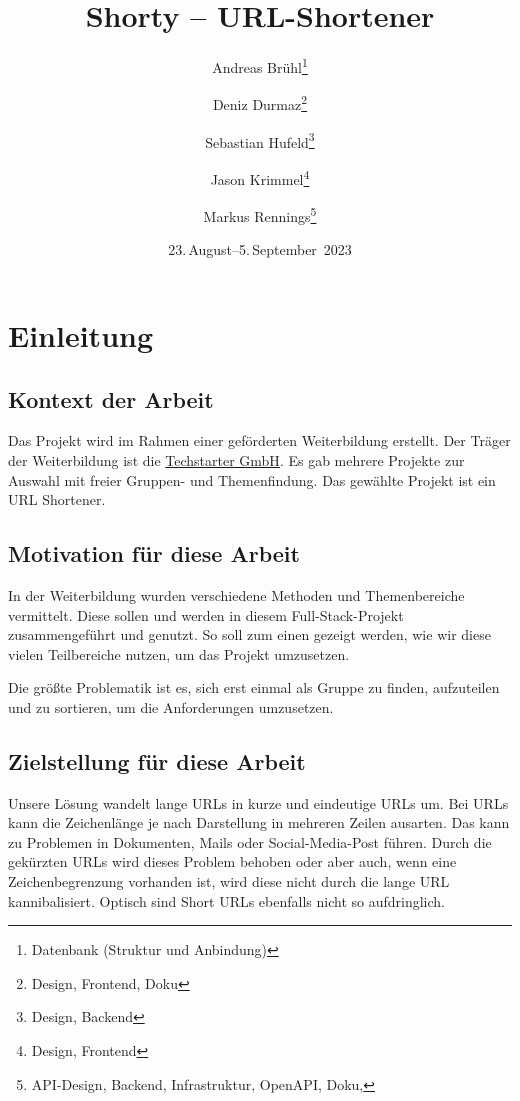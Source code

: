 \documentclass[a4paper,11pt,DIV=12,overfullrule=on]{scrreprt}
\title{Shorty – URL-Shortener}
\subtitle{}
\author{Andreas Brühl\thanks{Datenbank (Struktur und Anbindung)} \and Deniz Durmaz\thanks{Design, Frontend, Doku} \and Sebastian Hufeld\thanks{Design, Backend} \and Jason Krimmel\thanks{Design, Frontend} \and Markus Rennings\thanks{API-Design, Backend, Infrastruktur, OpenAPI, Doku, \XeLaTeX}}
\date{23.\,August–5.\,September~2023}
\begin{document}
\raggedbottom%
\maketitle

\tableofcontents

\chapter{Einleitung}
\section{Kontext der Arbeit}
Das Projekt wird im Rahmen einer geförderten Weiterbildung erstellt. Der Träger der Weiterbildung ist die \href{https://techstarter.de/}{Techstarter GmbH}. Es gab mehrere Projekte zur Auswahl mit freier Gruppen- und Themenfindung. Das gewählte Projekt ist ein URL Shortener.

\section{Motivation für diese Arbeit}
In der Weiterbildung wurden verschiedene Methoden und Themenbereiche vermittelt. Diese sollen und werden in diesem Full-Stack-Projekt zusammengeführt und genutzt. So soll zum einen gezeigt werden, wie wir diese vielen Teilbereiche nutzen, um das Projekt umzusetzen.

Die größte Problematik ist es, sich erst einmal als Gruppe zu finden, aufzuteilen und zu sortieren, um die Anforderungen umzusetzen.

\section{Zielstellung für diese Arbeit}
Unsere Lösung wandelt lange URLs in kurze und eindeutige URLs um. Bei URLs kann die Zeichenlänge je nach Darstellung in mehreren Zeilen ausarten. Das kann zu Problemen in Dokumenten, Mails oder Social-Media-Post führen. Durch die gekürzten URLs wird dieses Problem behoben oder aber auch, wenn eine Zeichenbegrenzung vorhanden ist, wird diese nicht durch die lange URL kannibalisiert. Optisch sind Short URLs ebenfalls nicht so aufdringlich.
\end{document}
